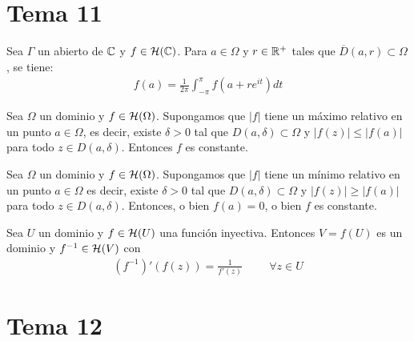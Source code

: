 \documentclass[12pt]{article}
\begin{document}
    \newpage

    \section{Tema 11}

    \begin{prop}
        Sea $\Gamma$ un abierto de $\mathbb{C}$ y $f\in \mathcal{H}(\mathbb{C})$. Para $a\in \Omega$ y $r\in \mathbb{R}^+$ tales que $\overline{D}(a,r)\subset \Omega$, se tiene:
        \begin{gather*}
            f(a) = \frac{1}{2\pi} \int_{-\pi}^{\pi} f(a+re^{it}) dt
        \end{gather*}
    \end{prop}

    \begin{teo} Sea $\Omega$ un dominio y $f\in \mathcal{H}(\Omega)$. Supongamos que $|f|$ tiene un máximo relativo en un punto $a\in \Omega$, es decir, existe $\delta > 0$ tal que $D(a, \delta)\subset \Omega$ y $|f(z)| \leq |f(a)|$ para todo $z\in D(a, \delta)$. Entonces $f$ es constante.
    \end{teo}

    \begin{teo} Sea $\Omega$ un dominio y $f\in \mathcal{H}(\Omega)$. Supongamos que $|f|$ tiene un mínimo relativo en un punto $a\in \Omega$ es decir, existe $\delta > 0$ tal que $D(a, \delta)\subset \Omega$ y $|f(z)| \geq |f(a)|$ para todo $z\in D(a, \delta)$. Entonces, o bien $f(a)=0$, o bien $f$ es constante.
    \end{teo}

    \begin{teo} Sea $U$ un dominio y $f\in \mathcal{H}(U)$ una función inyectiva. Entonces $V=f(U)$ es un dominio y $f^{-1}\in \mathcal{H}(V)$ con 
    \begin{gather*}
        (f^{-1})'(f(z)) = \frac{1}{f'(z)} \hspace{1cm} \forall z \in U
    \end{gather*}
    \end{teo}

    \newpage

    \section{Tema 12}
\end{document}

